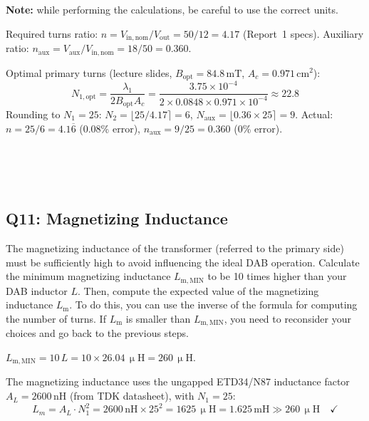 \documentclass{PELsmallreport}
\begin{document}
\textbf{Note:} while performing the calculations, be careful to use the correct units. 
\\

\begin{framed}
Required turns ratio: $n=V_\mathrm{in,nom}/V_\mathrm{out}=50/12=4.17$ (Report~1 specs).
Auxiliary ratio: $n_\mathrm{aux}=V_\mathrm{aux}/V_\mathrm{in,nom}=18/50=0.360$.

Optimal primary turns (lecture slides, $B_\mathrm{opt}=84.8\,\mathrm{mT}$, $A_c=0.971\,\mathrm{cm}^2$):
\begin{equation}
    N_{1,\mathrm{opt}} = \frac{\lambda_1}{2B_\mathrm{opt}A_c}
    = \frac{3.75\!\times\!10^{-4}}{2\times0.0848\times0.971\!\times\!10^{-4}} \approx 22.8
\end{equation}
Rounding to $N_1=25$: $N_2=\lfloor25/4.17\rceil=6$, $N_\mathrm{aux}=\lfloor0.36\times25\rceil=9$.
Actual: $n=25/6=4.1\overline{6}$ (0.08\% error), $n_\mathrm{aux}=9/25=0.360$ (0\% error).
\end{framed}

 \qquad {}  \\
 \qquad {} \qquad {}  \qquad  \hfill {} 
\\
 \qquad {}  \\


\subsection{Q11: Magnetizing Inductance} 
The magnetizing inductance of the transformer (referred to the primary side) must be sufficiently high to avoid influencing the ideal DAB operation. 
Calculate the minimum magnetizing inductance $L_\mathrm{m,MIN}$ to be 10 times higher than your DAB inductor $L$.
Then, compute the expected value of the magnetizing inductance $L_\mathrm{m}$. 
To do this, you can use the inverse of the formula for computing  the number of turns. 
If $L_\mathrm{m}$ is smaller than $L_\mathrm{m,MIN}$, you need to reconsider your choices and go back to the previous steps. 

\begin{framed}
$L_\mathrm{m,MIN} = 10\,L = 10\times26.04\,\upmu\mathrm{H} = 260\,\upmu\mathrm{H}$.

The magnetizing inductance uses the ungapped ETD34/N87 inductance factor $A_L = 2600\,\mathrm{nH}$ (from TDK datasheet), with $N_1 = 25$:
\begin{equation}
    L_m = A_L \cdot N_1^2 = 2600\,\mathrm{nH} \times 25^2 = 1625\,\upmu\mathrm{H} = 1.625\,\mathrm{mH} \gg 260\,\upmu\mathrm{H}\quad\checkmark
\end{equation}
\end{framed}
\end{document}
